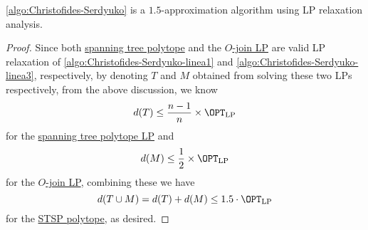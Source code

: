 \begin{theorem}
	\autoref{algo:Christofides-Serdyuko} is a \(1.5\)-approximation algorithm using LP relaxation analysis.
\end{theorem}
\begin{proof}
	Since both \hyperref[eq:spanning-tree-polytope]{spanning tree polytope} and the \hyperref[eq:O-join-LP]{\(O\)-join LP} are valid LP relaxation of \autoref{algo:Christofides-Serdyuko-linea1} and \autoref{algo:Christofides-Serdyuko-linea3}, respectively, by denoting \(T\) and \(M\) obtained from solving these two LPs respectively, from the above discussion, we know
	\[
		d(T) \leq \frac{n-1}{n}\times \OPT_{\mathrm{LP}}
	\]
	for the \hyperref[eq:spanning-tree-polytope]{spanning tree polytope LP} and
	\[
		d(M) \leq \frac{1}{2}\times \OPT_{\mathrm{LP} }
	\]
	for the \hyperref[eq:O-join-LP]{\(O\)-join LP}, combining these we have
	\[
		d(T \cup M) = d(T) + d(M) \leq 1.5\cdot \OPT_{\mathrm{LP} }
	\]
	for the \hyperref[eq:STSP-polytope]{STSP polytope}, as desired.
\end{proof}